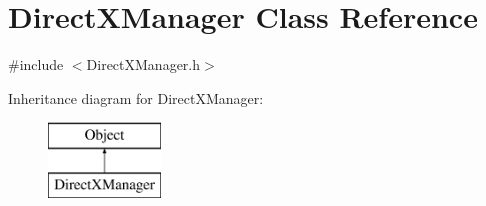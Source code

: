 \hypertarget{class_direct_x_manager}{}\section{Direct\+X\+Manager Class Reference}
\label{class_direct_x_manager}


{\ttfamily \#include $<$Direct\+X\+Manager.\+h$>$}

Inheritance diagram for Direct\+X\+Manager\+:\begin{figure}[H]
\begin{center}
\leavevmode
\includegraphics[height=2.000000cm]{class_direct_x_manager}
\end{center}
\end{figure}
